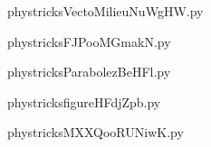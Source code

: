     

    \clearpage
    


    \newcommand{\CaptionFigVectoMilieuNuWgHW}{<+Type your caption here+>}
    \begin{center}
        
    \end{center}
    phystricksVectoMilieuNuWgHW.py

    

    \clearpage
    


    \newcommand{\CaptionFigFJPooMGmakN}{<+Type your caption here+>}
    \begin{center}
        
    \end{center}
    phystricksFJPooMGmakN.py

    

    \clearpage
    


    \newcommand{\CaptionFigParabolezBeHFl}{<+Type your caption here+>}
    \begin{center}
        
    \end{center}
    phystricksParabolezBeHFl.py

    

    \clearpage
    


    \newcommand{\CaptionFigfigureHFdjZpb}{<+Type your caption here+>}
    \begin{center}
        
    \end{center}
    phystricksfigureHFdjZpb.py

    

    \clearpage
    


    \newcommand{\CaptionFigMXXQooRUNiwK}{<+Type your caption here+>}
    \begin{center}
        
    \end{center}
    phystricksMXXQooRUNiwK.py

    

    \clearpage
    


